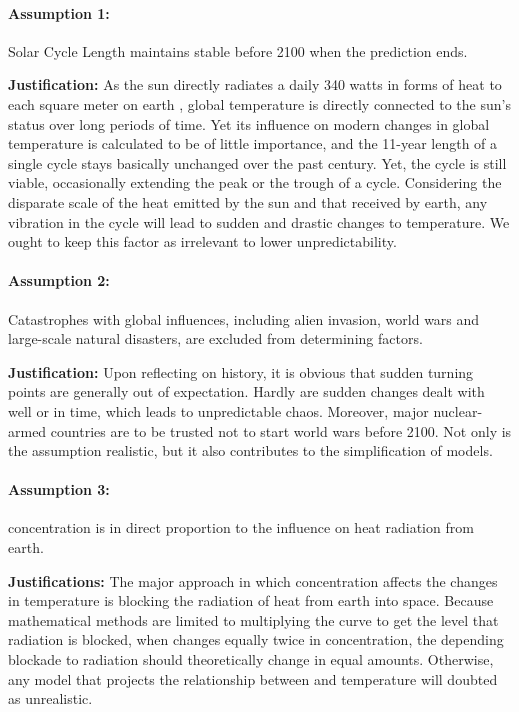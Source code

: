 \documentclass[12pt]{article}
\begin{document}
\paragraph{Assumption 1:} Solar Cycle Length maintains stable before 2100 when the prediction ends.

\noindent\textbf{Justification:} As the sun directly radiates a daily 340 watts in forms of heat to each square meter on earth , global temperature is directly connected to the sun's status over long periods of time. Yet its influence on modern changes in global temperature is calculated to be of little importance, and the 11-year length of a single cycle stays basically unchanged over the past century. Yet, the cycle is still viable, occasionally extending the peak or the trough of a cycle. Considering the disparate scale of the heat emitted by the sun and that received by earth, any vibration in the cycle will lead to sudden and drastic changes to temperature. We ought to keep this factor as irrelevant to lower unpredictability. 


\paragraph{Assumption 2:} Catastrophes with global influences, including alien invasion, world wars and large-scale natural disasters, are excluded from determining factors.

\noindent\textbf{Justification:} Upon reflecting on history, it is obvious that sudden turning points are generally out of expectation. Hardly are sudden changes dealt with well or in time, which leads to unpredictable chaos. Moreover, major nuclear-armed countries are to be trusted not to start world wars before 2100. Not only is the assumption realistic, but it also contributes to the simplification of models. 

\paragraph{Assumption 3:}  concentration is in direct proportion to the influence on heat radiation from earth. 

\noindent\textbf{Justifications:} The major approach in which  concentration affects the changes in temperature is blocking the radiation of heat from earth into space. Because mathematical methods are limited to multiplying the  curve to get the level that radiation is blocked, when  changes equally twice in concentration, the depending blockade to radiation should theoretically change in equal amounts. Otherwise, any model that projects the relationship between  and temperature will doubted as unrealistic.
\end{document}
